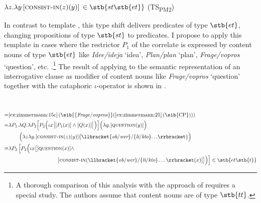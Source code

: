 \documentclass[output=paper]{langscibook}
\begin{document}
\ea\label{ex:zimmermann:21} $\lambda z . \lambda y \, [\textsc{consist-in} (z) (y)]$ $\in \stb{st\stb{et}}$ \hfill (TS\textsubscript{PM2}) \z

\noindent In contrast to template , this type shift delivers predicates of type $\stb{et}$, changing propositions of type $\stb{st}$ to predicates. I propose to apply this template in cases where the restrictor $P_1$ of the correlate is expressed by content nouns of type $\stb{et}$ like \textit{Idee/ideja} `idea', \textit{Plan/plan} `plan', \textit{Frage/vopros} `question', etc. \citep[see][]{Zimmermann2019a}.\footnote{A thorough comparison of this analysis with the approach of \citet{Fabricius-Hansen1989} requires a special study. The authors assume that content nouns are of type $\stb{tt}$.}
The result of applying  to the semantic representation of an interrogative clause as modifier of content nouns like \textit{Frage/vopros} `question' together with the cataphoric $\iota$-operator is shown in .


\ea\label{ex:zimmermann:22} \medskip\\\noindent
\begin{equation*}\begin{split}
 = & \text{\ref{ex:zimmermann:15c}\,(\sib{\{\textit{Frage}/\textit{vopros}\}}(\ref{ex:zimmermann:21}\,(\sib{CP})))}\\
 = & \lambda P_{1} . \lambda Q . \lambda P_{2} \Big[P_{2} \Big(\iota x \big[[P_{1} (x)] \wedge [Q (x)]\big]\Big)\Big] \Big(\lambda y. [\textsc{question} (y)]\Big)\\
  & \quad \quad \Big(\lambda z \lambda y. [\textsc{consist-in} (z) (y)] \big(\llbracket\{\textit{ob}/\textit{wer}\}/\{\textit{li}/\textit{kto}\} {\dots}\rrbracket\big)\Big)\\
\equiv & \lambda P_{2} \, \Big[P_{2}\Big(\iota x \big[[\textsc{question} (x)] \wedge \\
  & \hspace{3.25cm} [\textsc{consist-in} (\llbracket\{\textit{ob}/\textit{wer}\}/\{\textit{li}/\textit{kto}\} \dots\rrbracket (x)]\big]\Big)\Big] \in \stb{et\stb{t}}
\end{split}\end{equation*}
\z
\end{document}
